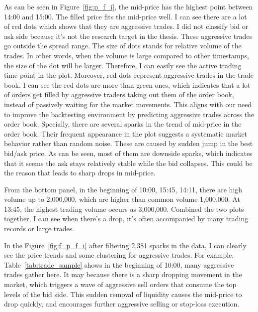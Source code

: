 

As can be seen in Figure~\ref{fig:p_f_i}, the mid-price has the highest point between 14:00 and 15:00. The filled price fits the mid-price well. I can see there are a lot of red dots which shows that they are aggressive trades. I did not classify bid or ask side because it's not the research target in the thesis. These aggressive trades go outside the spread range. The size of dots stands for relative volume of the trades. In other words, when the volume is large compared to other timestamps, the size of the dot will be larger. Therefore, I can easily see the active trading time point in the plot. Moreover, red dots represent aggressive trades in the trade book. I can see the red dots are more than green ones, which indicates that a lot of orders get filled by aggressive traders taking out them of the order book, instead of passively waiting for the market movements. This aligns with our need to improve the backtesting environment by predicting aggressive trades across the order book. Specially, there are several sparks in the trend of mid-price in the order book. Their frequent appearance in the plot suggests a systematic market behavior rather than random noise. These are caused by sudden jump in the best bid/ask price. As can be seen, most of them are downside sparks, which indicates that it seems the ask stays relatively stable while the bid collapses. This could be the reason that leads to sharp drops in mid-price.

From the bottom panel, in the beginning of 10:00, 15:45, 14:11, there are high volume up to 2,000,000, which are higher than common volume 1,000,000. At 13:45, the highest trading volume occurs as 3,000,000. Combined the two plots together, I can see when there's a drop, it's often accompanied by many trading records or large trades. 

In the Figure~\ref{fig:f_p_f_i} after filtering 2,381 sparks in the data, I can clearly see the price trends and some clustering for aggressive trades. For example, Table~\ref{tab:trade_sample} shows in the beginning of 10:00, many aggressive trades gather here. It may because there is a sharp dropping movement in the market, which triggers a wave of aggressive sell orders that consume the top levels of the bid side. This sudden removal of liquidity causes the mid-price to drop quickly, and encourages further aggressive selling or stop-loss execution.  

